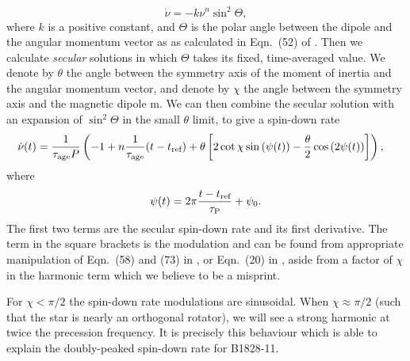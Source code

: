 \documentclass[../full_thesis/full_thesis.tex]{subfiles}
\begin{document}
\begin{equation}
\dot{\nu} = -k\nu^{n}\sin^{2}\Theta,
\end{equation}
where $k$ is a positive constant, and $\Theta$ is the
polar angle between the dipole and the angular momentum vector as
as calculated in Eqn.~(52) of \citet{Jones2001}.
Then we calculate \emph{secular} solutions in which $\Theta$ takes its fixed, time-averaged
value. We denote by $\theta$  the angle between the symmetry axis of the
moment of inertia and the angular momentum vector, and denote by $\chi$ the
angle between the symmetry axis and the magnetic dipole m.  We can then combine
the secular solution with an expansion of $\sin^2 \Theta$ in the small
$\theta$ limit, to give a spin-down rate
\begin{align}
\begin{split}
\dot{\nu}(t) = \frac{1}{\tau_{\mathrm{age}} P}&\left(-1 + n\frac{1}{\tau_{\mathrm{age}}} (t-t_{\textrm{ref}})
 + \theta \left[
2\cot\chi\sin\left(\psi(t)\right) - \frac{\theta}{2}\cos\left(2\psi(t)\right)
\right]\right),
\end{split}
\label{eqn: precession nudot degen}
\end{align}
where
\begin{equation}
\psi(t)= 2\pi\frac{t-t_{\textrm{ref}}}{\tau_{\mathrm{P}}} + \psi_{0}.
\end{equation}
The first two terms are the secular spin-down rate and its first derivative.
The term in the square brackets is the modulation and can be found from appropriate
manipulation of Eqn.~(58) and (73) in \citet{Jones2001}, or Eqn.~(20) in
\citet{Link2001}, aside from a factor of $\chi$ in the harmonic term which we
believe to be a misprint.

For $\chi < \pi/2$ the spin-down rate modulations are sinusoidal. When $\chi
\approx \pi/2$ (such that the star is nearly an orthogonal rotator), we will
see a strong harmonic at twice the precession frequency. It is precisely this
behaviour which is able to explain the doubly-peaked spin-down rate for
B1828-11.
\end{document}

